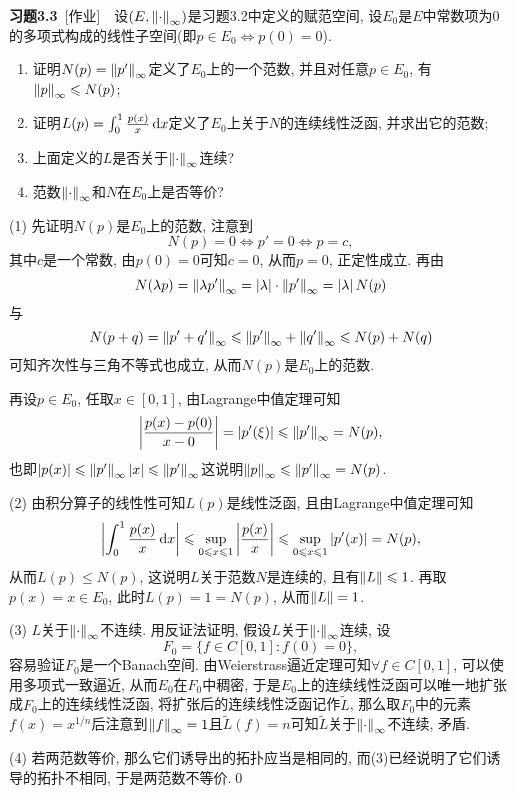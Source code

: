 	\textbf{习题3.3}\ [作业]\ \ 设$ (E,\left\| \cdot \right\|_\infty) $是习题3.2中定义的赋范空间, 设$ E_0 $是$ E $中常数项为0的多项式构成的线性子空间(即$ p\in E_0\Longleftrightarrow p(0)=0 $).
	\begin{enumerate}[(1)]
	\item 证明$ N(p)=\left\| p' \right\|_\infty $定义了$ E_0 $上的一个范数, 并且对任意$ p\in E_0 $, 有$ \left\| p \right\|_\infty\leqslant N(p) $;
	\item 证明$ L(p)=\int_0^1\frac{p(x)}{x}\,\mathrm{d} x $定义了$ E_0 $上关于$ N $的连续线性泛函, 并求出它的范数;
	\item 上面定义的$ L $是否关于$ \left\| \cdot \right\|_\infty $连续?
	\item 范数$ \left\| \cdot \right\|_\infty $和$ N $在$ E_0 $上是否等价?
	\end{enumerate}
	\begin{Proof}
	(1) 先证明$ N(p) $是$ E_0 $上的范数, 注意到
	\[
	N(p)=0\Longleftrightarrow p'=0\Longleftrightarrow p=c,
	\]
	其中$ c $是一个常数, 由$ p(0)=0 $可知$ c=0 $, 从而$ p=0 $, 正定性成立. 再由
	\[
	N(\lambda p)=\left\| \lambda p' \right\|_\infty=\left| \lambda \right| \cdot\left\| p' \right\|_\infty=\left| \lambda \right| N(p)
	\]
	与
	\[
	N(p+q)=\left\| p'+q' \right\|_\infty\leqslant\left\| p' \right\|_\infty+\left\| q' \right\|_\infty\leqslant N(p)+N(q)
	\]
	可知齐次性与三角不等式也成立, 从而$ N(p) $是$ E_0 $上的范数.
	
	再设$ p\in E_0 $, 任取$ x\in[0,1] $, 由Lagrange中值定理可知
	\[
	\left| \frac{p(x)-p(0)}{x-0} \right| =\left| p'(\xi) \right| \leqslant\left\| p' \right\|_\infty=N(p),
	\]
	也即$ \left| p(x) \right| \leqslant \left\| p' \right\|_\infty\left| x \right| \leqslant \left\| p' \right\|_\infty $这说明$ \left\| p \right\|_\infty\leqslant\left\| p' \right\|_\infty=N(p) $.
	
	(2) 由积分算子的线性性可知$ L(p) $是线性泛函, 且由Lagrange中值定理可知
	\[
	\left| \int_0^1\frac{p(x)}{x}\,\mathrm{d} x \right| \leqslant\sup_{0\leqslant x\leqslant 1}\left| \frac{p(x)}{x} \right| \leqslant\sup_{0\leqslant x\leqslant 1}\left| p'(x) \right| =N(p),
	\]
	从而$ L(p)\leqslant N(p) $, 这说明$ L $关于范数$ N $是连续的, 且有$ \left\| L \right\|\leqslant 1 $. 再取$ p(x)=x\in E_0 $, 此时$ L(p)=1=N(p) $, 从而$ \left\| L \right\|=1 $.
	
	(3) $ L $关于$ \left\| \cdot \right\|_\infty $不连续. 用反证法证明, 假设$ L $关于$ \left\| \cdot \right\|_\infty $连续, 设
	\[
	 F_0=\{ f\in C[0,1] : f(0)=0 \},
	\]
	容易验证$ F_0 $是一个Banach空间. 由Weierstrass逼近定理可知$ \forall f\in C[0,1] $, 可以使用多项式一致逼近, 从而$ E_0 $在$ F_0 $中稠密, 于是$ E_0 $上的连续线性泛函可以唯一地扩张成$ F_0 $上的连续线性泛函, 将扩张后的连续线性泛函记作$ \tilde{L} $, 那么取$ F_0 $中的元素$ f(x)=x^{1/n} $后注意到$ \left\| f \right\|_\infty=1 $且$ \tilde{L}(f)=n $可知$ \tilde{L} $关于$ \left\| \cdot \right\|_\infty $不连续, 矛盾.
	
	(4) 若两范数等价, 那么它们诱导出的拓扑应当是相同的, 而(3)已经说明了它们诱导的拓扑不相同, 于是两范数不等价.\qed
	\end{Proof}
	
